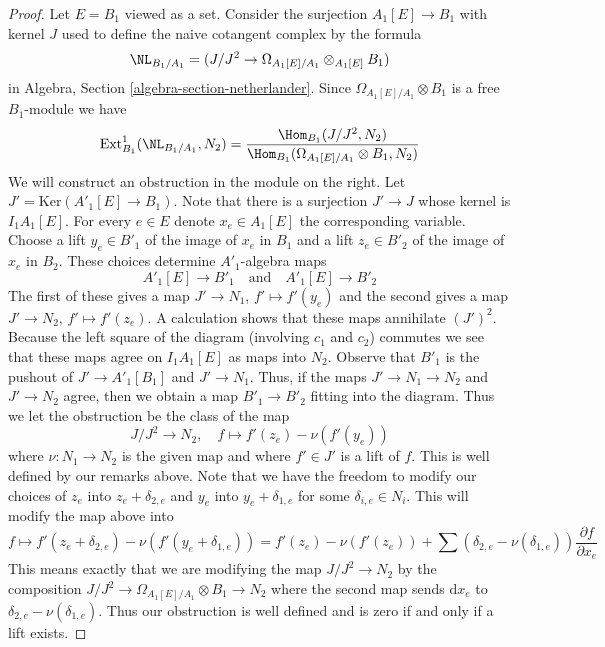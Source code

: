 \begin{proof}
Let $E = B_1$ viewed as a set.
Consider the surjection $A_1[E] \to B_1$ with kernel $J$ used
to define the naive cotangent complex by the formula
$$
\NL_{B_1/A_1} = (J/J^2 \to \Omega_{A_1[E]/A_1} \otimes_{A_1[E]} B_1)
$$
in
Algebra, Section \ref{algebra-section-netherlander}.
Since $\Omega_{A_1[E]/A_1} \otimes B_1$ is a free
$B_1$-module we have
$$
\text{Ext}^1_{B_1}(\NL_{B_1/A_1}, N_2) =
\frac{\Hom_{B_1}(J/J^2, N_2)}
{\Hom_{B_1}(\Omega_{A_1[E]/A_1} \otimes B_1, N_2)}
$$
We will construct an obstruction in the module on the right.
Let $J' = \text{Ker}(A'_1[E] \to B_1)$. Note that there is a surjection
$J' \to J$ whose kernel is $I_1A_1[E]$.
For every $e \in E$ denote $x_e \in A_1[E]$ the corresponding variable.
Choose a lift $y_e \in B'_1$ of the image of $x_e$ in $B_1$ and
a lift $z_e \in B'_2$ of the image of $x_e$ in $B_2$.
These choices determine $A'_1$-algebra maps
$$
A'_1[E] \to B'_1 \quad\text{and}\quad A'_1[E] \to B'_2
$$
The first of these gives a map $J' \to N_1$, $f' \mapsto f'(y_e)$
and the second gives a map $J' \to N_2$, $f' \mapsto f'(z_e)$.
A calculation shows that these maps annihilate $(J')^2$.
Because the left square of the diagram (involving $c_1$ and $c_2$)
commutes we see that these maps agree on $I_1A_1[E]$ as maps into $N_2$.
Observe that $B'_1$ is the pushout of $J' \to A'_1[B_1]$ and $J' \to N_1$. 
Thus, if the maps $J' \to N_1 \to N_2$ and $J' \to N_2$ agree, then we
obtain a map $B'_1 \to B'_2$ fitting into the diagram.
Thus we let the obstruction be the class of the map
$$
J/J^2 \to N_2,\quad f \mapsto f'(z_e) - \nu(f'(y_e))
$$
where $\nu : N_1 \to N_2$ is the given map and where $f' \in J'$
is a lift of $f$. This is well defined by our remarks above.
Note that we have the freedom
to modify our choices of $z_e$ into $z_e + \delta_{2, e}$
and $y_e$ into $y_e + \delta_{1, e}$ for some $\delta_{i, e} \in N_i$.
This will modify the map above into
$$
f \mapsto f'(z_e + \delta_{2, e}) - \nu(f'(y_e + \delta_{1, e})) =
f'(z_e) - \nu(f'(z_e)) +
\sum (\delta_{2, e} - \nu(\delta_{1, e}))\frac{\partial f}{\partial x_e}
$$
This means exactly that we are modifying the map $J/J^2 \to N_2$
by the composition $J/J^2 \to \Omega_{A_1[E]/A_1} \otimes B_1 \to N_2$
where the second map sends $\text{d}x_e$ to
$\delta_{2, e} - \nu(\delta_{1, e})$. Thus our obstruction is well defined
and is zero if and only if a lift exists.


\end{proof}
